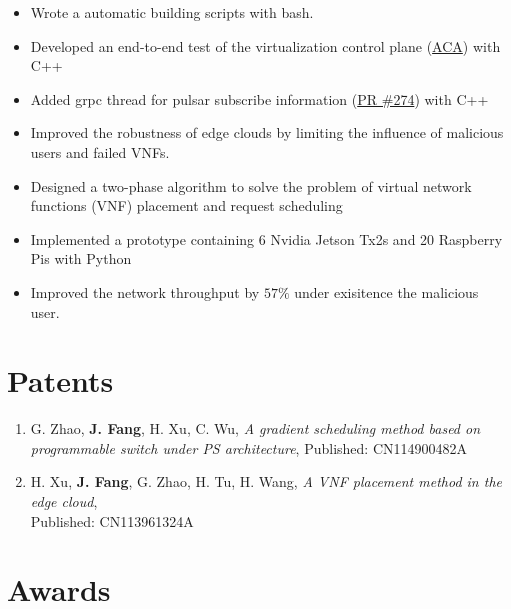 \documentclass{resume}
\begin{document}
\begin{itemize}
  \item Wrote a automatic building scripts with bash.
  \item Developed an end-to-end test of the virtualization control plane (\href{https://github.com/futurewei-cloud/alcor-control-agent}{ACA}) with C++
  \item Added grpc thread for pulsar subscribe information (\href{https://github.com/futurewei-cloud/alcor-control-agent/pull/274}{PR \#274}) with C++
\end{itemize}

\begin{itemize}
  \item Improved the robustness of edge clouds by limiting the influence of malicious users and failed VNFs.
  \item Designed a two-phase algorithm to solve the problem of virtual network functions (VNF) placement and request scheduling
  \item Implemented a prototype containing 6 Nvidia Jetson Tx2s and 20 Raspberry Pis with Python
  \item Improved the network throughput by $57\%$ under exisitence the malicious user.
\end{itemize}

\section{Patents}

\begin{enumerate}
  \item G. Zhao, \textbf{J. Fang}, H. Xu, C. Wu, \textit{A gradient scheduling method based on programmable switch under PS architecture}, Published: CN114900482A
  \item H. Xu, \textbf{J. Fang}, G. Zhao, H. Tu, H. Wang, \textit{A VNF placement method in the edge cloud}, \\ Published: CN113961324A
\end{enumerate}

\section{Awards}
\end{document}
